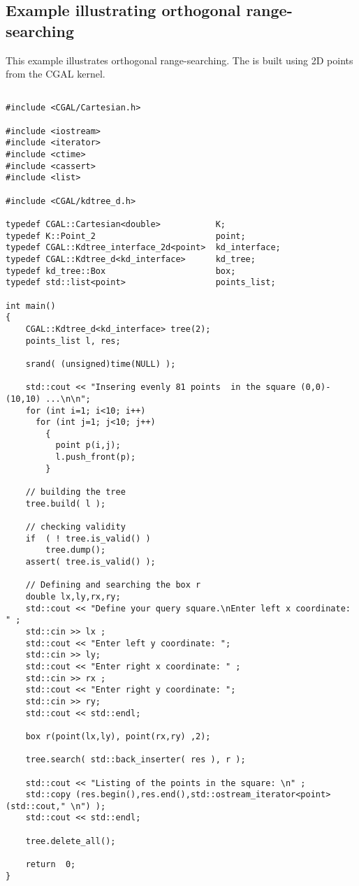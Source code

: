 \subsection{Example illustrating orthogonal range-searching}

\ccExample

This example illustrates orthogonal range-searching. 
The {\kdt} is built using 2D points from the CGAL kernel. 

\begin{verbatim}

#include <CGAL/Cartesian.h>

#include <iostream>
#include <iterator>
#include <ctime>
#include <cassert>
#include <list>

#include <CGAL/kdtree_d.h>

typedef CGAL::Cartesian<double>           K;
typedef K::Point_2                        point;
typedef CGAL::Kdtree_interface_2d<point>  kd_interface;
typedef CGAL::Kdtree_d<kd_interface>      kd_tree;
typedef kd_tree::Box                      box;
typedef std::list<point>                  points_list;

int main()
{
    CGAL::Kdtree_d<kd_interface> tree(2);
    points_list l, res;

    srand( (unsigned)time(NULL) );

    std::cout << "Insering evenly 81 points  in the square (0,0)-(10,10) ...\n\n";
    for (int i=1; i<10; i++)
      for (int j=1; j<10; j++)
        {
          point p(i,j);
          l.push_front(p);
        }

    // building the tree 
    tree.build( l );
       
    // checking validity
    if  ( ! tree.is_valid() )
        tree.dump();
    assert( tree.is_valid() );

    // Defining and searching the box r
    double lx,ly,rx,ry;
    std::cout << "Define your query square.\nEnter left x coordinate: " ;
    std::cin >> lx ;
    std::cout << "Enter left y coordinate: ";
    std::cin >> ly;
    std::cout << "Enter right x coordinate: " ;
    std::cin >> rx ;
    std::cout << "Enter right y coordinate: ";
    std::cin >> ry;
    std::cout << std::endl; 

    box r(point(lx,ly), point(rx,ry) ,2);

    tree.search( std::back_inserter( res ), r );
    
    std::cout << "Listing of the points in the square: \n" ;
    std::copy (res.begin(),res.end(),std::ostream_iterator<point>(std::cout," \n") );
    std::cout << std::endl;

    tree.delete_all();

    return  0;
}

\end{verbatim}


